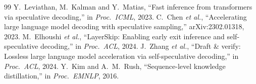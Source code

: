 \begin{thebibliography}{99}
 Y.~Leviathan, M.~Kalman and Y.~Matias, ``Fast inference from transformers via speculative decoding,'' in \emph{Proc.\ ICML}, 2023.
 C.~Chen \emph{et al.}, ``Accelerating large language model decoding with speculative sampling,'' arXiv:2302.01318, 2023.
 M.~Elhoushi \emph{et al.}, ``LayerSkip: Enabling early exit inference and self-speculative decoding,'' in \emph{Proc.\ ACL}, 2024.
 J.~Zhang \emph{et al.}, ``Draft \& verify: Lossless large language model acceleration via self-speculative decoding,'' in \emph{Proc.\ ACL}, 2024.
 Y.~Kim and A.~M.~Rush, ``Sequence-level knowledge distillation,'' in \emph{Proc.\ EMNLP}, 2016.
\end{thebibliography}
